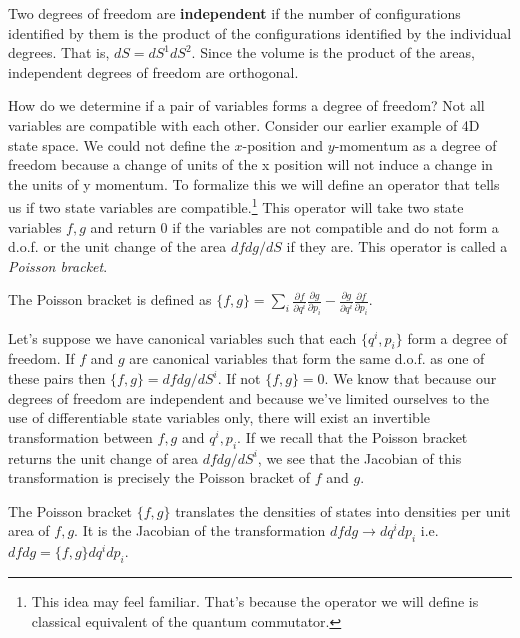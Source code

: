 \documentclass{article}[a4paper]
\begin{document}
\begin{defn}
	Two degrees of freedom are \textbf{independent} if the number of configurations identified by them is the product of the configurations identified by the individual degrees. That is, $dS = dS^1 dS^2$. Since the volume is the product of the areas, independent degrees of freedom are orthogonal.
\end{defn}

	How do we determine if a pair of variables forms a degree of freedom? Not all variables are compatible with each other. Consider our earlier example of 4D state space. We could not define the $x$-position and $y$-momentum as a degree of freedom because a change of units of the x position will not induce a change in the units of y momentum. To formalize this we will define an operator that tells us if two state variables are compatible.\footnote{This idea may feel familiar. That's because the operator we will define is classical equivalent of the quantum commutator.} This operator will take two state variables $f,g$ and return 0 if the variables are not compatible and do not form a d.o.f. or the unit change of the area $dfdg/dS$ if they are. This operator is called a \textit{Poisson bracket}.

\begin{defn}
	The Poisson bracket is defined as $\{f,g\} = \sum_i \frac{\partial f}{\partial q^i}\frac{\partial g}{\partial p_i} - \frac{\partial g}{\partial q^i}\frac{\partial f}{\partial p_i}$.
\end{defn}

	Let's suppose we have canonical variables such that each $\{q^i,p_i\}$ form a degree of freedom. If $f$ and $g$ are canonical variables that form the same d.o.f. as one of these pairs then $\{f,g \} = dfdg/dS^i$. If not $\{f,g \} = 0$. We know that because our degrees of freedom are independent and because we've limited ourselves to the use of differentiable state variables only, there will exist an invertible transformation between $f,g$ and $q^i,p_i$. If we recall that the Poisson bracket returns the unit change of area $dfdg/dS^i$, we see that the Jacobian of this transformation is precisely the Poisson bracket of $f$ and $g$.

\begin{prop}
	The Poisson bracket $\{f, g\}$ translates the densities of states into densities per unit area of $f, g$. It is the Jacobian of the transformation $dfdg \rightarrow dq^idp_i$ i.e. $dfdg = \{f,g\}dq^idp_i$.
\end{prop}
	
\end{document}
